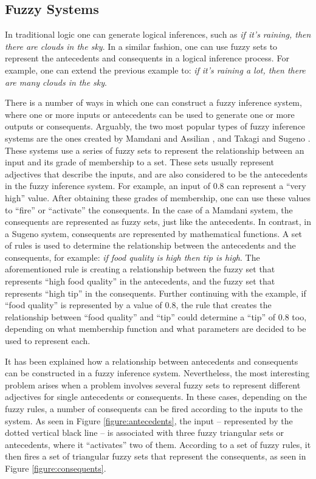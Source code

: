 \documentclass[review]{elsarticle}
\begin{document}
\subsection{Fuzzy Systems}
\label{subsection:fuzzy-systems}

In traditional logic one can generate logical inferences, such as \textit{if it's raining, then there are clouds in the sky}. In a similar fashion, one can use fuzzy sets to represent the antecedents and consequents in a logical inference process. For example, one can extend the previous example to: \textit{if it's raining a lot, then there are many clouds in the sky}.

There is a number of ways in which one can construct a fuzzy inference system, where one or more inputs or antecedents can be used to generate one or more outputs or consequents. Arguably, the two most popular types of fuzzy inference systems are the ones created by Mamdani and Assilian \cite{Mamdani1975}, and Takagi and Sugeno \cite{Takagi1985}. These systems use a series of fuzzy sets to represent the relationship between an input and its grade of membership to a set. These sets usually represent adjectives that describe the inputs, and are also considered to be the antecedents in the fuzzy inference system. For example, an input of 0.8 can represent a ``very high'' value. After obtaining these grades of membership, one can use these values to ``fire'' or ``activate'' the consequents. In the case of a Mamdani system, the consequents are represented as fuzzy sets, just like the antecedents. In contrast, in a Sugeno system, consequents are represented by mathematical functions. A set of rules is used to determine the relationship between the antecedents and the consequents, for example: \textit{if food quality is high then tip is high}. The aforementioned rule is creating a relationship between the fuzzy set that represents ``high food quality'' in the antecedents, and the fuzzy set that represents ``high tip'' in the consequents. Further continuing with the example, if ``food quality'' is represented by a value of 0.8, the rule that creates the relationship between ``food quality'' and ``tip'' could determine a ``tip'' of 0.8 too, depending on what membership function and what parameters are decided to be used to represent each.

It has been explained how a relationship between antecedents and consequents can be constructed in a fuzzy inference system. Nevertheless, the most interesting problem arises when a problem involves several fuzzy sets to represent different adjectives for single antecedents or consequents. In these cases, depending on the fuzzy rules, a number of consequents can be fired according to the inputs to the system. As seen in Figure \ref{figure:antecedents}, the input -- represented by the dotted vertical black line -- is associated with three fuzzy triangular sets or antecedents, where it ``activates'' two of them. According to a set of fuzzy rules, it then fires a set of triangular fuzzy sets that represent the consequents, as seen in Figure \ref{figure:consequents}.
\end{document}
